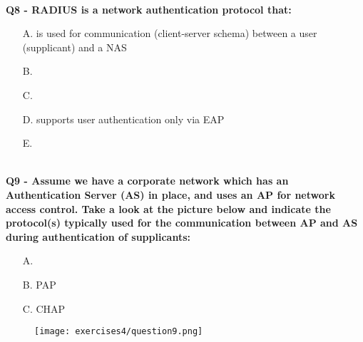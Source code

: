 \textbf{\\Q8 - RADIUS is a network authentication protocol that:}
\begin{itemize}
    \item[A.] is used for communication (client-server schema) between a user (supplicant) and a NAS
    \item[B.] 
    \item[C.] 
    \item[D.] supports user authentication only via EAP
    \item[E.] 
\end{itemize}

\textbf{\\Q9 - Assume we have a corporate network which has an Authentication Server (AS) in place, and uses an AP for network access control.
    Take a look at the picture below and indicate the protocol(s) typically used for the communication between AP and AS during authentication of supplicants:}
\begin{itemize}
    \item[A.] 
    \item[B.] PAP
    \item[C.] CHAP
\end{itemize}
\begin{figure}[h]
    \centering
    \texttt{[image: exercises4/question9.png]}
\end{figure}


